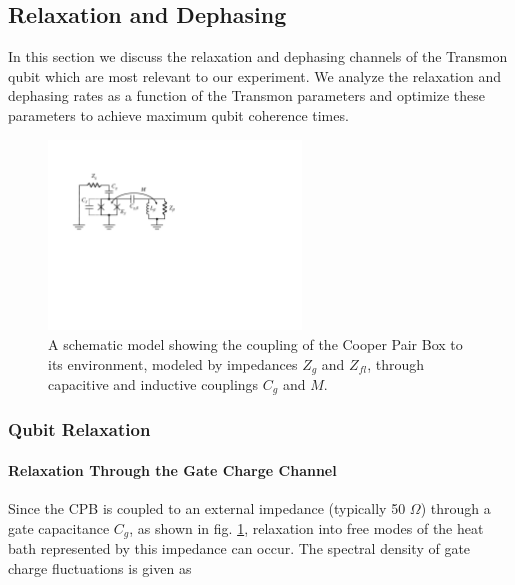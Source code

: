 \subsection{Relaxation and Dephasing}

In this section we discuss the relaxation and dephasing channels of the Transmon qubit which are most relevant to our experiment. We analyze the relaxation and dephasing rates as a function of the Transmon parameters and optimize these parameters to achieve maximum qubit coherence times.

\begin{figure}
	\centering
	\includegraphics[width=0.6\textwidth]{./material/figures/introduction/cooper_pair_box_decoherence}
	\caption[]{A schematic model showing the coupling of the Cooper Pair Box to its environment, modeled by impedances $Z_g$ and $Z_{fl}$, through capacitive and inductive couplings $C_g$ and $M$.}
	\label{fig:cooper_pair_box_decoherence}
\end{figure}

\subsubsection{Qubit Relaxation}

\paragraph{Relaxation Through the Gate Charge Channel}

Since the CPB is coupled to an external impedance (typically 50 $\Omega$) through a gate capacitance $C_g$, as shown in fig. \ref{fig:cooper_pair_box_decoherence}, relaxation into free modes of the heat bath represented by this impedance can occur. The spectral density of gate charge fluctuations is given as

